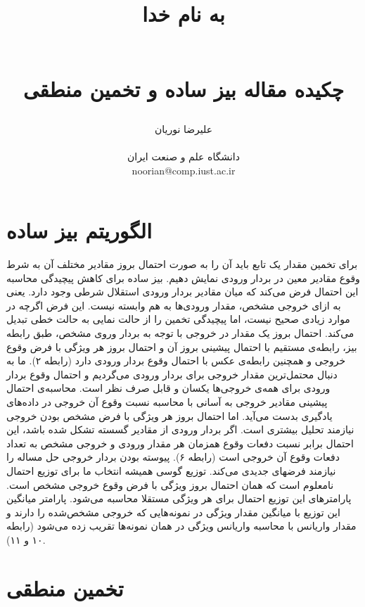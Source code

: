\documentclass{article}
\title{ 
\begin{normalsize} به نام خدا \end{normalsize}
\\[7cm]
چکیده مقاله بیز ساده و تخمین منطقی
\\[3cm]
}
\author{علیرضا نوریان
\\
\\ \small دانشگاه علم و صنعت ایران
\\ \small noorian@comp.iust.ac.ir
}
\begin{document}
\maketitle

\section{الگوریتم بیز ساده}
برای تخمین مقدار یک تابع باید آن را به صورت احتمال بروز مقادیر مختلف آن به شرط وقوع مقادیر معین در بردار ورودی نمایش دهیم. بیز ساده برای کاهش پیچیدگی محاسبه این احتمال فرض می‌کند که میان مقادیر بردار ورودی استقلال شرطی وجود دارد. یعنی به ازای خروجی مشخص، مقدار ورودی‌ها به هم وابسته نیست. این فرض اگرچه در موارد زیادی صحیح نیست، اما پیچیدگی تخمین را از حالت نمایی به حالت خطی تبدیل می‌کند.
احتمال بروز یک مقدار در خروجی با توجه به بردار وروی مشخص، طبق رابطه بیز، رابطه‌ی مستقیم با احتمال پیشینی بروز آن و احتمال بروز هر ویژگی با فرض وقوع خروجی و همچنین رابطه‌ی عکس با احتمال وقوع بردار ورودی دارد (رابطه ۲). ما به دنبال محتمل‌ترین مقدار خروجی برای بردار ورودی می‌گردیم و احتمال وقوع بردار ورودی برای همه‌ی خروجی‌ها یکسان و قابل صرف نظر است.
محاسبه‌ی احتمال پیشینی مقادیر خروجی به آسانی با محاسبه نسبت وقوع آن خروجی در داده‌های یادگیری بدست می‌آید. اما احتمال بروز هر ویژگی با فرض مشخص بودن خروجی نیازمند تحلیل بیشتری است. اگر بردار ورودی از مقادیر گسسته تشکل شده باشد، این احتمال برابر نسبت دفعات وقوع همزمان هر مقدار ورودی و خروجی مشخص به تعداد دفعات وقوع آن خروجی است (رابطه ۶).
پیوسته بودن بردار خروجی حل مساله را نیازمند فرضهای جدیدی می‌کند. توزیع گوسی همیشه انتخاب ما برای توزیع احتمال نامعلوم است که همان احتمال بروز ویژگی با فرض وقوع خروجی مشخص است. پارامترهای این توزیع احتمال برای هر ویژگی مستقلا محاسبه می‌شود. پارامتر میانگین این توزیع با میانگین مقدار ویژگی در نمونه‌هایی که خروجی مشخص‌شده را دارند و مقدار واریانس با محاسبه واریانس ویژگی در همان نمونه‌ها تقریب زده می‌شود (رابطه ۱۰  و ۱۱).

\section{تخمین منطقی}
\end{document}
